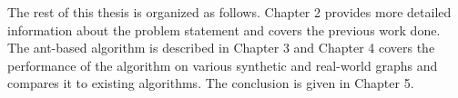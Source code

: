 \begin{spacing}{1.5}
\indent The rest of this thesis is organized as follows. Chapter 2 provides more detailed information about the problem statement and covers the previous work done. The ant-based algorithm is described in Chapter 3 and Chapter 4 covers the performance of the algorithm on various synthetic and real-world graphs and compares it to existing algorithms. The conclusion is given in Chapter 5.
\end{spacing}